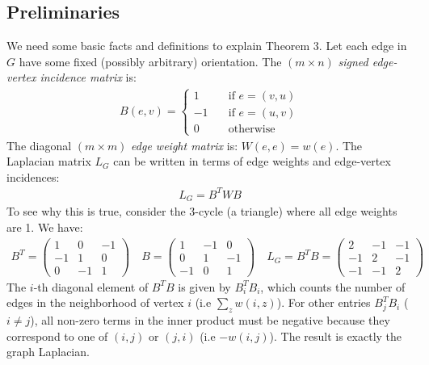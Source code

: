 \documentclass{article}
\begin{document}
\subsection{Preliminaries}

We need some basic facts and definitions to explain Theorem 3. Let each edge
in $G$ have some fixed (possibly arbitrary) orientation. The $(m \times n)$
\textit{signed edge-vertex incidence matrix} is:
\begin{align*}
    B(e, v) =
    \begin{cases}
        1 \quad &\text{if } e = (v, u) \\
        -1 \quad &\text{if } e = (u, v) \\
        0 \quad &\text{otherwise}
    \end{cases}
\end{align*}
The diagonal $(m \times m)$ \textit{edge weight matrix} is: $W(e, e) =
w(e)$. The Laplacian matrix $L_G$ can be written in terms of edge weights
and edge-vertex incidences:
\begin{align*}
    L_G = B^TWB
\end{align*}
To see why this is true, consider the 3-cycle (a triangle) where all edge
weights are 1. We have:
\begin{align*}
    B^T =
    \begin{pmatrix}
        1 & 0 & -1 \\
        -1 & 1 & 0 \\
        0 & -1 & 1
    \end{pmatrix} \quad
    B =
    \begin{pmatrix}
        1 & -1 & 0 \\
        0 & 1 & -1 \\
        -1 & 0 & 1
    \end{pmatrix} \quad
    L_G = B^TB =
    \begin{pmatrix}
        2 & -1 & -1 \\
        -1 & 2 & -1 \\
        -1 & -1 & 2
    \end{pmatrix}
\end{align*}
The $i$-th diagonal element of $B^TB$ is given by $B^T_iB_i$, which counts
the number of edges in the neighborhood of vertex $i$ (i.e $\sum_z w(i,
z)$). For other entries $B^T_jB_i$ ($i \not= j$), all non-zero terms in the
inner product must be negative because they correspond to one of $(i, j)$ or
$(j, i)$ (i.e $-w(i, j)$). The result is exactly the graph Laplacian.
\end{document}
